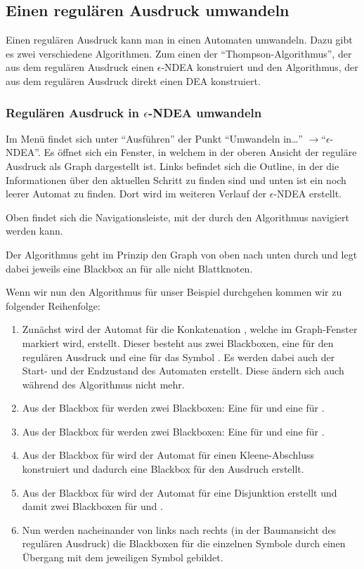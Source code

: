 \subsection{Einen regulären Ausdruck umwandeln}

Einen regulären Ausdruck kann man in einen Automaten umwandeln. Dazu gibt es zwei verschiedene Algorithmen. Zum einen der "`Thompson-Algorithmus"', der aus dem regulären Ausdruck einen $\epsilon$-NDEA konstruiert und den Algorithmus, der aus dem regulären Ausdruck direkt einen DEA konstruiert.

\subsubsection{Regulären Ausdruck in $\epsilon$-NDEA umwandeln}

Im Menü findet sich unter "`Ausführen"' der Punkt "`Umwandeln in\ldots"' $\rightarrow$"`$\epsilon$-NDEA"'. Es öffnet sich ein Fenster, in welchem in der oberen Ansicht der reguläre Ausdruck als Graph dargestellt ist. Links befindet sich die Outline, in der die Informationen über den aktuellen Schritt zu finden sind und unten ist ein noch leerer Automat zu finden. Dort wird im weiteren Verlauf der $\epsilon$-NDEA erstellt.

Oben findet sich die Navigationsleiste, mit der durch den Algorithmus navigiert werden kann.

Der Algorithmus geht im Prinzip den Graph von oben nach unten durch und legt dabei jeweils eine Blackbox an für alle nicht Blattknoten. 

Wenn wir nun den Algorithmus für unser Beispiel durchgehen kommen wir zu folgender Reihenfolge:
\begin{enumerate}
  \item Zunächst wird der Automat für die Konkatenation , welche im Graph-Fenster markiert wird, erstellt. Dieser besteht aus zwei Blackboxen, eine für den regulären Ausdruck  und eine für das Symbol . Es werden dabei auch der Start- und der Endzustand des Automaten erstellt. Diese ändern sich auch während des Algorithmus nicht mehr.
  \item Aus der Blackbox für  werden zwei Blackboxen: Eine für  und eine für .
  \item Aus der Blackbox für  werden zwei Blackboxen: Eine für  und eine für .
  \item Aus der Blackbox für  wird der Automat für einen Kleene-Abschluss konstruiert und dadurch eine Blackbox für den Ausdruch  erstellt.
  \item Aus der Blackbox für  wird der Automat für eine Disjunktion erstellt und damit zwei Blackboxen für  und .
  \item Nun werden nacheinander von links nach rechts (in der Baumansicht des regulären Ausdruck) die Blackboxen für die einzelnen Symbole durch einen Übergang mit dem jeweiligen Symbol gebildet.
\end{enumerate}

